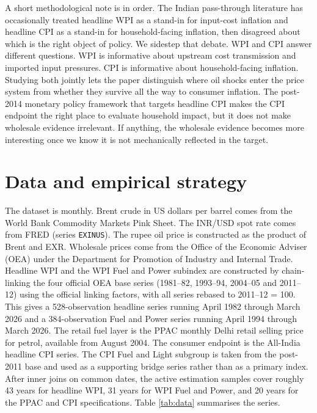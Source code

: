 \documentclass[11pt,a4paper]{article}
\begin{document}
A short methodological note is in order. The Indian pass-through literature has occasionally treated headline WPI as a stand-in for input-cost inflation and headline CPI as a stand-in for household-facing inflation, then disagreed about which is the right object of policy. We sidestep that debate. WPI and CPI answer different questions. WPI is informative about upstream cost transmission and imported input pressures. CPI is informative about household-facing inflation. Studying both jointly lets the paper distinguish where oil shocks enter the price system from whether they survive all the way to consumer inflation. The post-2014 monetary policy framework that targets headline CPI \citep{rbi2014} makes the CPI endpoint the right place to evaluate household impact, but it does not make wholesale evidence irrelevant. If anything, the wholesale evidence becomes more interesting once we know it is not mechanically reflected in the target.

\section{Data and empirical strategy}
\label{sec:data}

The dataset is monthly. Brent crude in US dollars per barrel comes from the World Bank Commodity Markets Pink Sheet. The INR/USD spot rate comes from FRED (series \texttt{EXINUS}). The rupee oil price is constructed as the product of Brent and EXR. Wholesale prices come from the Office of the Economic Adviser (OEA) under the Department for Promotion of Industry and Internal Trade. Headline WPI and the WPI Fuel and Power subindex are constructed by chain-linking the four official OEA base series (1981--82, 1993--94, 2004--05 and 2011--12) using the official linking factors, with all series rebased to 2011--12 = 100. This gives a 528-observation headline series running April 1982 through March 2026 and a 384-observation Fuel and Power series running April 1994 through March 2026. The retail fuel layer is the PPAC monthly Delhi retail selling price for petrol, available from August 2004. The consumer endpoint is the All-India headline CPI series. The CPI Fuel and Light subgroup is taken from the post-2011 base and used as a supporting bridge series rather than as a primary index. After inner joins on common dates, the active estimation samples cover roughly 43 years for headline WPI, 31 years for WPI Fuel and Power, and 20 years for the PPAC and CPI specifications. Table \ref{tab:data} summarises the series.
\end{document}
